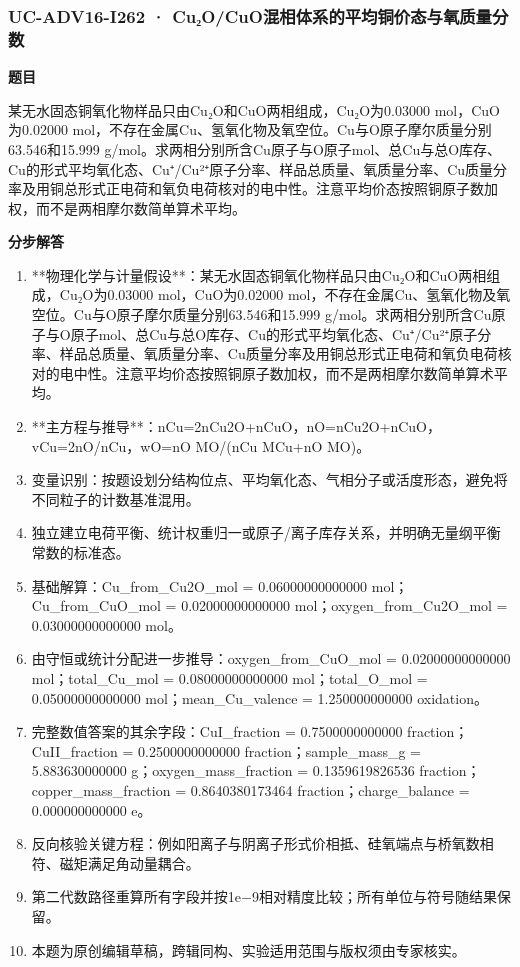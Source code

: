 \documentclass[UTF8,11pt,a4paper]{ctexart}
\begin{document}
\subsubsection*{UC-ADV16-I262 · Cu₂O/CuO混相体系的平均铜价态与氧质量分数}
\noindent\textbf{题目}\par
某无水固态铜氧化物样品只由Cu₂O和CuO两相组成，Cu₂O为0.03000 mol，CuO为0.02000 mol，不存在金属Cu、氢氧化物及氧空位。Cu与O原子摩尔质量分别63.546和15.999 g/mol。求两相分别所含Cu原子与O原子mol、总Cu与总O库存、Cu的形式平均氧化态、Cu⁺/Cu²⁺原子分率、样品总质量、氧质量分率、Cu质量分率及用铜总形式正电荷和氧负电荷核对的电中性。注意平均价态按照铜原子数加权，而不是两相摩尔数简单算术平均。\par
\medskip\noindent\textbf{分步解答}
\begin{enumerate}
\item **物理化学与计量假设**：某无水固态铜氧化物样品只由Cu₂O和CuO两相组成，Cu₂O为0.03000 mol，CuO为0.02000 mol，不存在金属Cu、氢氧化物及氧空位。Cu与O原子摩尔质量分别63.546和15.999 g/mol。求两相分别所含Cu原子与O原子mol、总Cu与总O库存、Cu的形式平均氧化态、Cu⁺/Cu²⁺原子分率、样品总质量、氧质量分率、Cu质量分率及用铜总形式正电荷和氧负电荷核对的电中性。注意平均价态按照铜原子数加权，而不是两相摩尔数简单算术平均。
\item **主方程与推导**：nCu=2nCu2O+nCuO，nO=nCu2O+nCuO，vCu=2nO/nCu，wO=nO MO/(nCu MCu+nO MO)。
\item 变量识别：按题设划分结构位点、平均氧化态、气相分子或活度形态，避免将不同粒子的计数基准混用。
\item 独立建立电荷平衡、统计权重归一或原子/离子库存关系，并明确无量纲平衡常数的标准态。
\item 基础解算：Cu\_from\_Cu2O\_mol = 0.06000000000000 mol；Cu\_from\_CuO\_mol = 0.02000000000000 mol；oxygen\_from\_Cu2O\_mol = 0.03000000000000 mol。
\item 由守恒或统计分配进一步推导：oxygen\_from\_CuO\_mol = 0.02000000000000 mol；total\_Cu\_mol = 0.08000000000000 mol；total\_O\_mol = 0.05000000000000 mol；mean\_Cu\_valence = 1.250000000000 oxidation。
\item 完整数值答案的其余字段：CuI\_fraction = 0.7500000000000 fraction；CuII\_fraction = 0.2500000000000 fraction；sample\_mass\_g = 5.883630000000 g；oxygen\_mass\_fraction = 0.1359619826536 fraction；copper\_mass\_fraction = 0.8640380173464 fraction；charge\_balance = 0.000000000000 e。
\item 反向核验关键方程：例如阳离子与阴离子形式价相抵、硅氧端点与桥氧数相符、磁矩满足角动量耦合。
\item 第二代数路径重算所有字段并按1e−9相对精度比较；所有单位与符号随结果保留。
\item 本题为原创编辑草稿，跨辑同构、实验适用范围与版权须由专家核实。
\end{enumerate}
\end{document}
